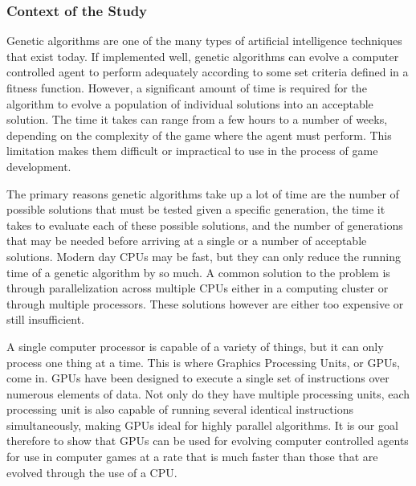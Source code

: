 \subsubsection*{Context of the Study}
Genetic algorithms are one of the many types of artificial intelligence
techniques that exist today. If implemented well, genetic algorithms can
evolve a computer controlled agent to perform adequately according to some
set criteria defined in a fitness function. However, a significant amount of 
time is required for the algorithm to evolve a population of individual solutions 
into an acceptable solution. The time it takes can range from a few hours to a number
of weeks, depending on the complexity of the game where the agent must perform.
This limitation makes them difficult or impractical to use in the process of
game development.


The primary reasons genetic algorithms take up a lot of time are the number of 
possible solutions that must be tested given a specific generation, the time it 
takes to evaluate each of these possible solutions, and the number of generations 
that may be needed before arriving at a single or a number of acceptable solutions. 
Modern day CPUs may be fast, but they can only reduce
the running time of a genetic algorithm by so much. A common solution to the
problem is through parallelization across multiple CPUs either in a computing
cluster or through multiple processors. These solutions however are either
too expensive or still insufficient.


A single computer processor is capable of a variety of things, but it can only process
one thing at a time. This is where Graphics Processing Units, or GPUs, come in.
GPUs have been designed to execute a single set of instructions over numerous elements
of data. Not only do they have multiple processing units, each processing unit is also
capable of running several identical instructions simultaneously, making GPUs ideal
for highly parallel algorithms. It is our goal therefore to show that GPUs can be used
for evolving computer controlled agents for use in computer games at a rate that is much
faster than those that are evolved through the use of a CPU.